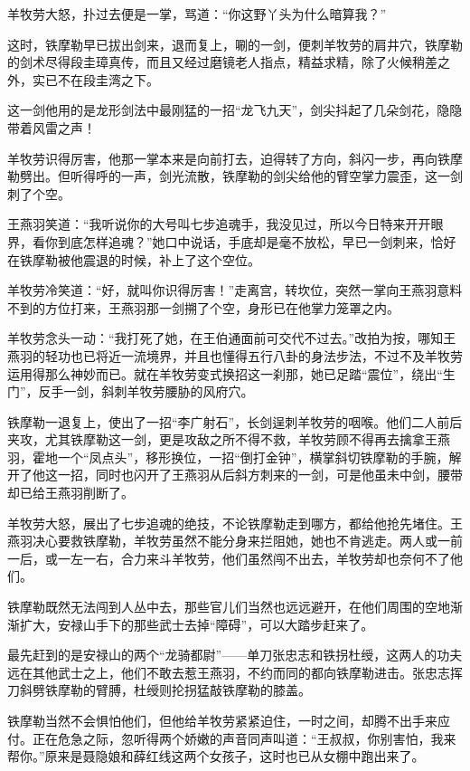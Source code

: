 \documentclass[12pt,oneside]{book}
\begin{document}
羊牧劳大怒，扑过去便是一掌，骂道：``你这野丫头为什么暗算我？''

这时，铁摩勒早已拔出剑来，退而复上，唰的一剑，便刺羊牧劳的肩井穴，铁摩勒的剑术尽得段圭璋真传，而且又经过磨镜老人指点，精益求精，除了火候稍差之外，实已不在段圭湾之下。

这一剑他用的是龙形剑法中最刚猛的一招``龙飞九天''，剑尖抖起了几朵剑花，隐隐带着风雷之声！

羊牧劳识得厉害，他那一掌本来是向前打去，迫得转了方向，斜闪一步，再向铁摩勒劈出。但听得呼的一声，剑光流散，铁摩勒的剑尖给他的臂空掌力震歪，这一剑刺了个空。

王燕羽笑道：``我听说你的大号叫七步追魂手，我没见过，所以今日特来开开眼界，看你到底怎样追魂？''她口中说话，手底却是毫不放松，早已一剑刺来，恰好在铁摩勒被他震退的时候，补上了这个空位。

羊牧劳冷笑道：``好，就叫你识得厉害！''走离宫，转坎位，突然一掌向王燕羽意料不到的方位打来，王燕羽那一剑搠了个空，身形已在他掌力笼罩之内。

羊牧劳念头一动：``我打死了她，在王伯通面前可交代不过去。''改拍为按，哪知王燕羽的轻功也已将近一流境界，并且也懂得五行八卦的身法步法，不过不及羊牧劳运用得那么神妙而已。就在羊牧劳变式换招这一刹那，她已足踏``震位''，绕出``生门''，反手一剑，斜刺羊牧劳腰胁的风府穴。

铁摩勒一退复上，使出了一招``李广射石''，长剑逞刺羊牧劳的咽喉。他们二人前后夹攻，尤其铁摩勒这一剑，更是攻敌之所不得不救，羊牧劳顾不得再去擒拿王燕羽，霍地一个``凤点头''，移形换位，一招``倒打金钟''，横掌斜切铁摩勒的手腕，解开了他这一招，同时也闪开了王燕羽从后斜方刺来的一剑，可是他虽未中剑，腰带却已给王燕羽削断了。

羊牧劳大怒，展出了七步追魂的绝技，不论铁摩勒走到哪方，都给他抢先堵住。王燕羽决心要救铁摩勒，羊牧劳虽然不能分身来拦阻她，她也不肯逃走。两人或一前一后，或一左一右，合力来斗羊牧劳，他们虽然闯不出去，羊牧劳却也奈何不了他们。

铁摩勒既然无法闯到人丛中去，那些官儿们当然也远远避开，在他们周围的空地渐渐扩大，安禄山手下的那些武士去掉``障碍''，可以大踏步赶来了。

最先赶到的是安禄山的两个``龙骑都尉''------单刀张忠志和铁拐杜绶，这两人的功夫远在其他武士之上，他们不敢去惹王燕羽，不约而同的都向铁摩勒进击。张忠志挥刀斜劈铁摩勒的臂膊，杜绶则抡拐猛敲铁摩勒的膝盖。

铁摩勒当然不会惧怕他们，但他给羊牧劳紧紧迫住，一时之间，却腾不出手来应付。正在危急之际，忽听得两个娇嫩的声音同声叫道：``王叔叔，你别害怕，我来帮你。''原来是聂隐娘和薛红线这两个女孩子，这时也已从女棚中跑出来了。
\end{document}
